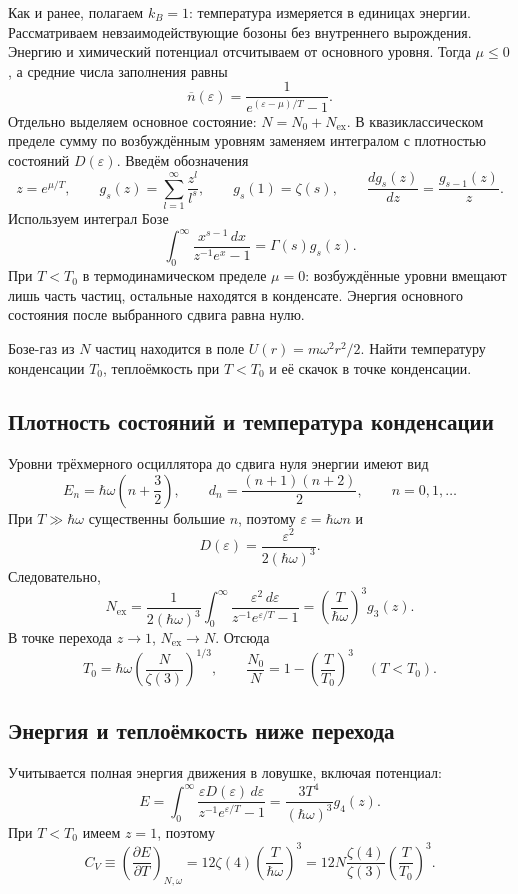 \documentclass[../final.tex]{subfiles}
\begin{document}

Как и ранее, полагаем $k_B=1$: температура измеряется в единицах
энергии. Рассматриваем невзаимодействующие бозоны без внутреннего
вырождения. Энергию и химический потенциал отсчитываем от основного
уровня. Тогда $\mu\leq0$, а средние числа заполнения равны
\[
 \overline n(\varepsilon)=\frac{1}{e^{(\varepsilon-\mu)/T}-1}.
\]
Отдельно выделяем основное состояние: $N=N_0+N_{\mathrm{ex}}$.
В квазиклассическом пределе сумму по возбуждённым уровням заменяем
интегралом с плотностью состояний $D(\varepsilon)$.
Введём обозначения
\[
 z=e^{\mu/T},\qquad
 g_s(z)=\sum_{l=1}^{\infty}\frac{z^l}{l^s},\qquad
 g_s(1)=\zeta(s),\qquad
 \frac{d g_s(z)}{dz}=\frac{g_{s-1}(z)}{z}.
\]
Используем интеграл Бозе
\[
 \int_0^\infty\frac{x^{s-1}\,dx}{z^{-1}e^x-1}
 =\Gamma(s)g_s(z).
\]
При $T<T_0$ в термодинамическом пределе $\mu=0$: возбуждённые
уровни вмещают лишь часть частиц, остальные находятся в конденсате.
Энергия основного состояния после выбранного сдвига равна нулю.

\condition
Бозе-газ из $N$ частиц находится в поле
$U(r)=m\omega^2r^2/2$. Найти температуру конденсации $T_0$,
теплоёмкость при $T<T_0$ и её скачок в точке конденсации.

\subsection*{Плотность состояний и температура конденсации}
Уровни трёхмерного осциллятора до сдвига нуля энергии имеют вид
\[
 E_n=\hbar\omega\left(n+\frac32\right),\qquad
 d_n=\frac{(n+1)(n+2)}2,\qquad n=0,1,\ldots
\]
При $T\gg\hbar\omega$ существенны большие $n$, поэтому
$\varepsilon=\hbar\omega n$ и
\[
 D(\varepsilon)=\frac{\varepsilon^2}{2(\hbar\omega)^3}.
\]
Следовательно,
\[
 N_{\mathrm{ex}}=\frac{1}{2(\hbar\omega)^3}
 \int_0^\infty\frac{\varepsilon^2\,d\varepsilon}
 {z^{-1}e^{\varepsilon/T}-1}
 =\left(\frac{T}{\hbar\omega}\right)^3g_3(z).
\]
В точке перехода $z\to1$, $N_{\mathrm{ex}}\to N$. Отсюда
\[
 \boxed{T_0=\hbar\omega\left(\frac{N}{\zeta(3)}\right)^{1/3}},
 \qquad \frac{N_0}{N}=1-\left(\frac{T}{T_0}\right)^3
 \quad(T<T_0).
\]

\subsection*{Энергия и теплоёмкость ниже перехода}
Учитывается полная энергия движения в ловушке, включая потенциал:
\[
 E=\int_0^\infty\frac{\varepsilon D(\varepsilon)\,d\varepsilon}
 {z^{-1}e^{\varepsilon/T}-1}
 =\frac{3T^4}{(\hbar\omega)^3}g_4(z).
\]
При $T<T_0$ имеем $z=1$, поэтому
\[
 \boxed{C_V\equiv\left(\frac{\partial E}{\partial T}\right)_{N,\omega}
 =12\zeta(4)\left(\frac{T}{\hbar\omega}\right)^3
 =12N\frac{\zeta(4)}{\zeta(3)}\left(\frac{T}{T_0}\right)^3}.
\]
\end{document}
